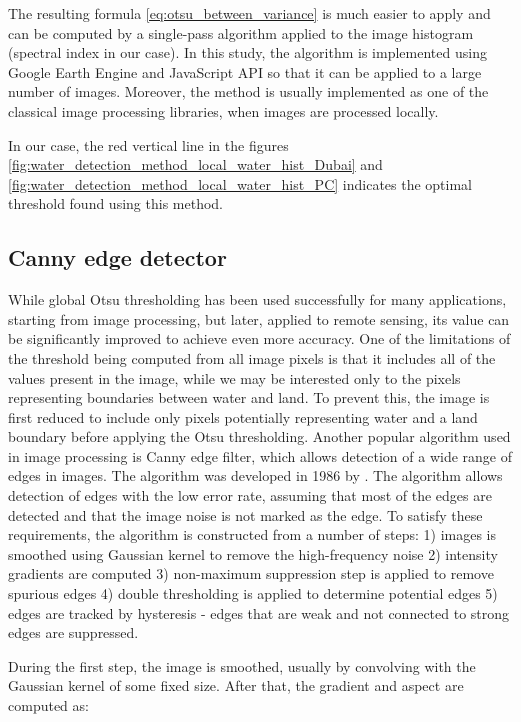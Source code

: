 The resulting formula \ref{eq:otsu_between_variance} is much easier to apply and can be computed by a single-pass algorithm applied to the image histogram (spectral index in our case). In this study, the algorithm is implemented using Google Earth Engine and JavaScript API so that it can be applied to a large number of images. Moreover, the method is usually implemented as one of the classical image processing libraries, when images are processed locally.

In our case, the red vertical line in the figures \ref{fig:water_detection_method_local_water_hist_Dubai} and \ref{fig:water_detection_method_local_water_hist_PC} indicates the optimal threshold found using this method.

\subsection{Canny edge detector}

While global Otsu thresholding has been used successfully for many applications, starting from image processing, but later, applied to remote sensing, its value can be significantly improved to achieve even more accuracy. One of the limitations of the threshold being computed from all image pixels is that it includes all of the values present in the image, while we may be interested only to the pixels representing boundaries between water and land. To prevent this, the image is first reduced to include only pixels potentially representing water and a land boundary before applying the Otsu thresholding. Another popular algorithm used in image processing is Canny edge filter, which allows detection of a wide range of edges in images. The algorithm was developed in 1986 by \citep{canny1986computational}. The algorithm allows detection of edges with the low error rate, assuming that most of the edges are detected and that the image noise is not marked as the edge. To satisfy these requirements, the algorithm is constructed from a number of steps: 1) images is smoothed using Gaussian kernel to remove the high-frequency noise 2) intensity gradients are computed 3) non-maximum suppression step is applied to remove spurious edges 4) double thresholding is applied to determine potential edges 5) edges are tracked by hysteresis - edges that are weak and not connected to strong edges are suppressed.

During the first step, the image is smoothed, usually by convolving with the Gaussian kernel of some fixed size. After that, the gradient and aspect are computed as:

